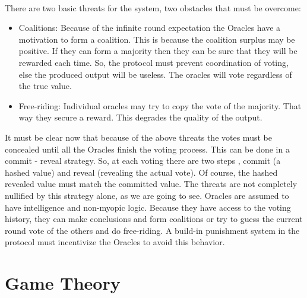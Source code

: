 \documentclass{article}
\begin{document}
 \paragraph{ }
 There are two basic threats for the system, two obstacles that must be overcome:
 \begin{itemize}
 \item Coalitions: Because of the infinite round expectation the Oracles have a motivation to form a coalition. This is because the coalition surplus may be positive. If they can form a majority then they can be sure that they will be rewarded each time. So, the protocol must prevent coordination of voting, else the produced output will be useless. The oracles will vote regardless of the true value.
 \item Free-riding: Individual oracles may try to copy the vote of the majority. That way they secure a reward. This degrades the quality of the output.
 \end{itemize}
 \par
 It must be clear now that because of the above threats the votes must be concealed until all the Oracles finish the voting process. This can be done in a commit - reveal strategy. So, at each voting there are two steps , commit (a hashed value) and reveal (revealing the actual vote). Of course, the hashed revealed value must match the committed value. The threats are not completely nullified by this strategy alone, as we are going to see. Oracles are assumed to have intelligence and non-myopic logic. Because they have access to the voting history, they can make conclusions and form coalitions or try to guess the current round vote of the others and do free-riding. A build-in punishment system in the protocol must incentivize the Oracles to avoid this behavior.
 

\section{Game Theory}
\end{document}
